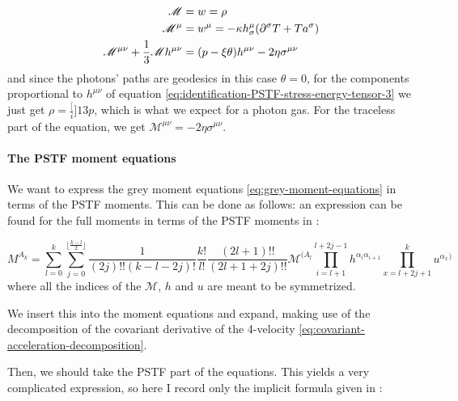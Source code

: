 \documentclass[main.tex]{subfiles}
\begin{document}
\begin{subequations}
\begin{align}
  \mathscr M &= w = \rho  \label{eq:identification-PSTF-stress-energy-tensor-1}\\
  \mathscr M ^\mu &= w^\mu = -\kappa h^\mu _\sigma  \qty(\partial^\sigma T + T a^\sigma) \label{eq:identification-PSTF-stress-energy-tensor-2}\\
  \mathscr M^{\mu\nu} + \frac{1}{3} \mathscr M h^{\mu\nu}
  &= (p - \xi \theta)h^{\mu\nu} - 2 \eta \sigma^{\mu\nu} \label{eq:identification-PSTF-stress-energy-tensor-3}
\end{align}
\end{subequations}
and since the photons' paths are geodesics in this case \(\theta = 0\), for the components proportional to \(h^{\mu\nu}\) of equation \eqref{eq:identification-PSTF-stress-energy-tensor-3} we just get \(\rho = \frac[i]{1}{3} p\), which is what we expect for a photon gas.
For the traceless part of the equation, we get \(\mathscr M ^{\mu\nu} = -2 \eta \sigma^{\mu\nu}\).

\paragraph{The PSTF moment equations}

We want to express the grey moment equations \eqref{eq:grey-moment-equations} in terms of the PSTF moments. This can be done as follows: an expression can be found for the full moments in terms of the PSTF moments in \cite[eq. 4.10c]{Thorne:1981feb}:

\begin{equation}
  M^{A_k} = \sum_{l=0}^k \sum_{j=0}^{\lfloor \frac{k-l}{2} \rfloor}
  \frac{1}{(2j)!! (k-l-2j)!}  \frac{k!}{l!} \frac{(2l+1)!!}{(2l+1+2j)!!}
  \mathscr M^{(A_l} \prod_{i=l+1}^{l+2j-1} h^{\alpha_i \alpha_{i+1}}
  \prod_{x=l+2j+1}^k u^{\alpha_x)}
\end{equation}
where all the indices of the \(\mathscr M\), \(h\) and \(u\) are meant to be symmetrized.

We insert this into the moment equations and expand, making use of the decomposition of the covariant derivative of the 4-velocity \eqref{eq:covariant-acceleration-decomposition}.

Then, we should take the PSTF part of the equations. This yields a very complicated expression, so here I record only the implicit formula given in \textcite[eq. 4.11c]{Thorne:1981feb}:
\end{document}
